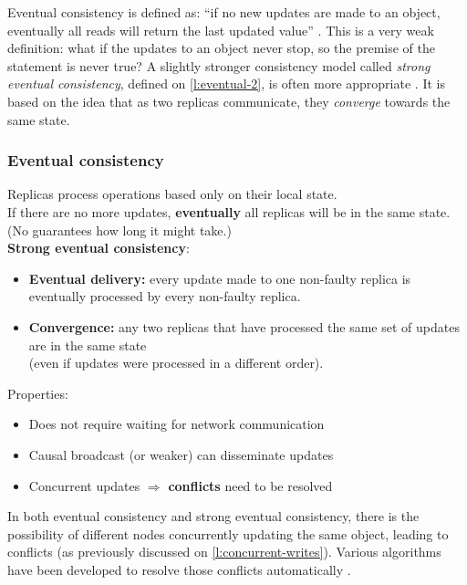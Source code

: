 Eventual consistency is defined as: ``if no new updates are made to an object, eventually all reads will return the last updated value'' \citep{Vogels:2009}.
This is a very weak definition: what if the updates to an object never stop, so the premise of the statement is never true?
A slightly stronger consistency model called \emph{strong eventual consistency}, defined on \autoref{l:eventual-2}, is often more appropriate \citep{Shapiro:2011}.
It is based on the idea that as two replicas communicate, they \emph{converge} towards the same state.

\begin{frame}
    \label{s:eventual-2}
    \frametitle{Eventual consistency}
    Replicas process operations based only on their local state.\\[0.5em]
    If there are no more updates, \textbf{eventually} all replicas will be in the same state.
    (No guarantees how long it might take.)\\[0.5em]\pause
    \textbf{Strong eventual consistency}:
    \begin{itemize}
        \item \textbf{Eventual delivery:} every update made to one non-faulty replica is eventually processed by every non-faulty replica.\pause
        \item \textbf{Convergence:} any two replicas that have processed the same set of updates are in the same state\\
            (even if updates were processed in a different order).\\[0.5em]\pause
    \end{itemize}
    Properties:
    \begin{itemize}
        \item Does not require waiting for network communication
        \item Causal broadcast (or weaker) can disseminate updates\pause
        \item Concurrent updates $\Longrightarrow$ \textbf{conflicts} need to be resolved
    \end{itemize}
\end{frame}
\label{l:eventual-2}

In both eventual consistency and strong eventual consistency, there is the possibility of different nodes concurrently updating the same object, leading to conflicts (as previously discussed on \autoref{l:concurrent-writes}).
Various algorithms have been developed to resolve those conflicts automatically \citep{Shapiro:2011}.

